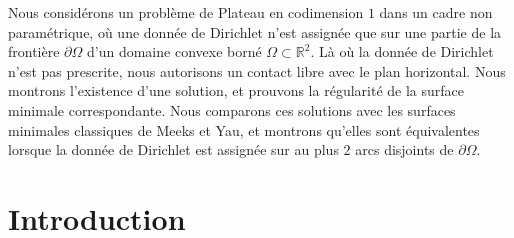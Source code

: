 \documentclass[JEP,XML,SOM,Unicode, NoFloatCountersInSection,published]{cedram}
\theoremstyle{definition}
\begin{document}




\begin{altabstract}
Nous considérons un problème de Plateau en codimension $1$ dans un cadre non paramétrique, où une donnée de Dirichlet n'est assignée que sur une partie de la frontière $\partial\Omega$ d'un domaine convexe borné $\Omega\subset\mathbb{R}^2$. Là où la donnée de Dirichlet n'est pas prescrite, nous autorisons un contact libre avec le plan horizontal. Nous montrons l'existence d'une solution, et prouvons la régularité de la surface minimale correspondante. Nous comparons ces solutions avec les surfaces minimales classiques de Meeks et Yau, et montrons qu'elles sont équivalentes lorsque la donnée de Dirichlet est assignée sur au plus $2$ arcs disjoints de $\partial \Omega$.
\end{altabstract}

\maketitle
\vspace*{-\baselineskip}
\tableofcontents
\mainmatter

\section{Introduction}\label{sec:introduction}
\end{document}
